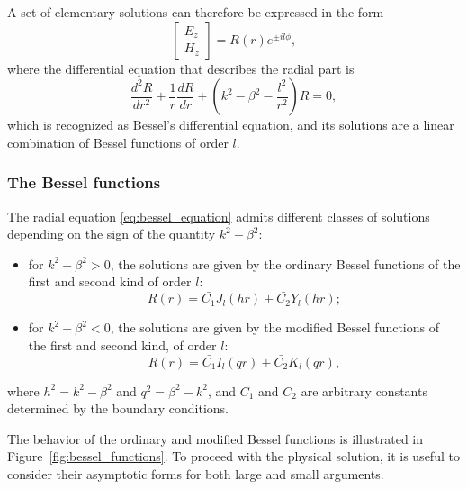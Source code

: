 A set of elementary solutions can therefore be expressed in the form
\begin{equation*}
    \begin{bmatrix}
        E_z \\
        H_z
    \end{bmatrix}
    =R(r)e^{\pm il\phi},
\end{equation*}
where the differential equation that describes the radial part is
\begin{equation}
    \label{eq:bessel_equation}
    \frac{d^2 R}{d r^2} +
    \frac{1}{r}\frac{d R}{d r} +
    \left(k^2-\beta^2-\frac{l^2}{r^2}\right) R =0,
\end{equation}
which is recognized as Bessel's differential equation, and its solutions are a linear combination of Bessel functions of order $l$.

\subsubsection{The Bessel functions}
The radial equation \eqref{eq:bessel_equation} admits different classes of solutions depending on the sign of the quantity $k^2-\beta^2$:
\begin{itemize}
    \item for $k^2 -\beta^2 >0$, the solutions are given by the ordinary Bessel functions of the first and second kind of order $l$:
    \begin{equation}
        \label{eq:bessel_function_conditions}
        R(r) = \bar{C_1} J_l(hr) + \bar{C_2} Y_l(hr);
    \end{equation} 

    \item for $k^2 -\beta^2 <0$, the solutions are given by the modified Bessel functions of the first and second kind, of order $l$:
    \begin{equation}
        \label{eq:modified_bessel_function_conditions}
        R(r) = \bar{C_1} I_l(qr) + \bar{C_2} K_l(qr),
    \end{equation}
\end{itemize}
where $h^2 = k^2 -\beta^2$ and $q^2=\beta^2-k^2$, and $\bar{C_1}$ and $\bar{C_2}$ are arbitrary constants determined by the boundary conditions.

The behavior of the ordinary and modified Bessel functions is illustrated in Figure~\ref{fig:bessel_functions}. To proceed with the physical solution, it is useful to consider their asymptotic forms for both large and small arguments.

